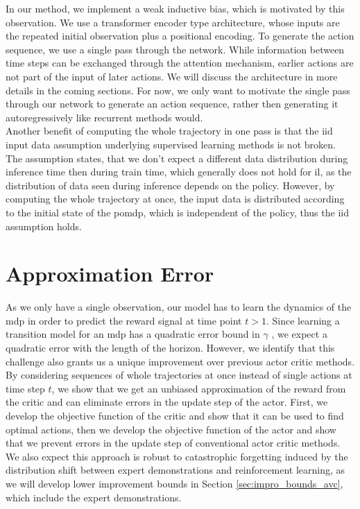 In our method, we implement a weak inductive bias, which is motivated by this observation. We use a transformer encoder type architecture, whose inputs are 
the repeated initial observation plus a positional encoding. To generate the action sequence, we use a single pass through the network. While 
information between time steps can be exchanged through the attention mechanism, earlier actions are not part of the input of later actions. 
We will discuss the architecture in more details in the coming sections. For now, we only want to motivate the single pass through 
our network to generate an action sequence, rather then generating it autoregressively like recurrent methods would.\\ 

Another benefit of computing the whole trajectory in one pass is that the \ac{iid} input data 
assumption underlying supervised learning methods is not broken. The assumption states, that we don't expect a different data distribution during inference time 
then during train time, which generally does not hold for \ac{il}, as the distribution of data seen during inference depends on the policy. 
However, by computing the whole trajectory at once, the input data is distributed according to the initial state of the \ac{pomdp}, which is independent of 
the policy, thus the \ac{iid} assumption holds.\\

\section{Approximation Error}
\label{inference_time_planning}
As we only have a single observation, our model has to learn the dynamics of the \ac{mdp} in order to predict the reward signal at time point $t > 1$. 
Since learning a transition model for an \ac{mdp} has a quadratic error bound in $\gamma$ \cite{NEURIPS2020_b5c01503}, we expect a quadratic error with the length of the horizon.
However, we identify that this challenge also grants us a unique improvement over previous actor critic methods.\\ 

By considering sequences of whole trajectories at once instead of single actions 
at time step $t$, 
we show that we get an unbiased approximation of the reward from the critic and can eliminate errors in the update step of the actor. First, we develop the objective function of the critic and 
show that it can be used to find optimal actions, then we develop the objective function of the actor and show that we prevent errors in the update step of conventional actor critic methods. 
We also expect this approach is robust to catastrophic forgetting induced by the distribution shift between expert demonstrations and reinforcement learning, 
as we will develop lower improvement bounds in Section \ref{sec:impro_bounds_avc}, which include the expert demonstrations.\\

